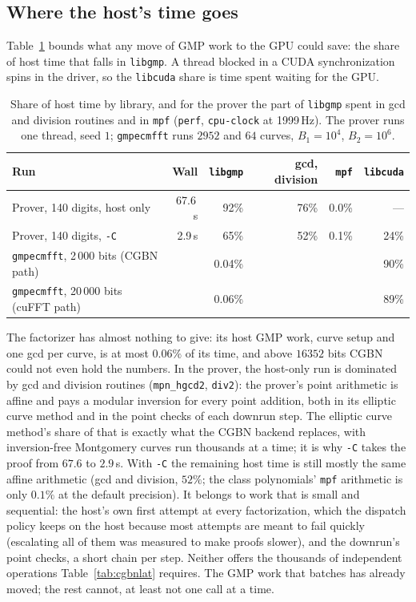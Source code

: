 \documentclass[11pt,a4paper]{article}
\newcommand{\code}[1]{\texttt{#1}}
\begin{document}
\subsection{Where the host's time goes}

Table~\ref{tab:gmpshare} bounds what any move of GMP work to the GPU could save: the share of
host time that falls in \code{libgmp}. A thread blocked in a CUDA synchronization spins in the
driver, so the \code{libcuda} share is time spent waiting for the GPU.

\begin{table}[t]
\centering
\begin{tabular}{lrrrrr}
\toprule
Run & Wall & \code{libgmp} & gcd, division & \code{mpf} & \code{libcuda} \\
\midrule
Prover, 140 digits, host only & 67.6\,s & 92\% & 76\% & 0.0\% & --- \\
Prover, 140 digits, \code{-C} & 2.9\,s  & 65\% & 52\% & 0.1\% & 24\% \\
\code{gmpecmfft}, 2\,000 bits (CGBN path) & & 0.04\% & & & 90\% \\
\code{gmpecmfft}, 20\,000 bits (cuFFT path) & & 0.06\% & & & 89\% \\
\bottomrule
\end{tabular}
\caption{Share of host time by library, and for the prover the part of \code{libgmp} spent in
  gcd and division routines and in \code{mpf} (\code{perf}, \code{cpu-clock} at 1999\,Hz). The
  prover runs one thread, seed $1$; \code{gmpecmfft} runs $2952$ and $64$ curves,
  $B_1 = 10^4$, $B_2 = 10^6$.}
\label{tab:gmpshare}
\end{table}

The factorizer has almost nothing to give: its host GMP work, curve setup and one gcd per curve,
is at most $0.06\%$ of its time, and above $16352$ bits CGBN could not even hold the numbers.
In the prover, the host-only run is dominated by gcd and division routines
(\code{mpn\_hgcd2}, \code{div2}): the prover's point arithmetic is affine and pays a modular
inversion for every point addition, both in its elliptic curve method and in the point checks of
each downrun step. The elliptic curve method's share of that is exactly what the CGBN backend
replaces, with inversion-free Montgomery curves run thousands at a time; it is why \code{-C}
takes the proof from $67.6$ to $2.9$\,s. With \code{-C} the remaining host time is still
mostly the same affine arithmetic (gcd and division, $52\%$; the class polynomials' \code{mpf}
arithmetic is only $0.1\%$ at the default precision). It belongs to work that is small and
sequential: the host's own first attempt at every factorization, which the dispatch policy keeps
on the host because most attempts are meant to fail quickly (escalating all of them was measured
to make proofs slower), and the downrun's point checks, a short chain per step. Neither offers
the thousands of independent operations Table~\ref{tab:cgbnlat} requires. The GMP work that
batches has already moved; the rest cannot, at least not one call at a time.
\end{document}
